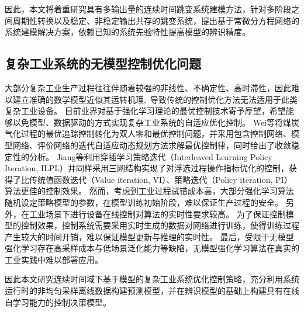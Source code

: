 因此，本文将着重研究具有多输出量的连续时间跳变系统建模方法，针对多阶段之间周期性转换以及稳定、非稳定输出共存的跳变系统，提出基于常微分方程网络的系统建模解决方案，依赖已知的系统先验特性提高模型的辨识精度。

\subsection{复杂工业系统的无模型控制优化问题}
大部分复杂工业生产过程往往伴随着较强的非线性、不确定性、高时滞性，因此难以建立准确的数学模型近似其运转机理, 导致传统的控制优化方法无法适用于此类复杂工业设备。
目前业界对基于强化学习理论的最优控制技术\cite{Sutton2018,F.L.LewisD.Vrabie2012}寄予厚望，希望能够以免模型、数据驱动的方式实现复杂工业系统的自适应优化控制。
Wei等\cite{Wei2014}将煤炭气化过程的最优追踪控制转化为双人零和最优控制问题，并采用包含控制网络、模型网络、评价网络的迭代自适应动态规划方法求解最优控制律，同时给出了收敛稳定性的分析。
Jiang等\cite{Jiang2018}利用穿插学习策略迭代（Interleaved Learning
Policy Iteration, ILPL）并同样采用三网结构实现了对浮选过程操作指标优化的控制，获得了比传统值函数迭代（Value iteration, VI）、策略迭代（Policy iteration, PI）算法更佳的控制效果。
然而，考虑到工业过程试错成本高，大部分强化学习算法随机设定策略模型的参数，在模型训练初始阶段，难以保证生产过程的安全。
另外，在工业场景下进行设备在线控制对算法的实时性要求较高。
为了保证控制模型的控制效果，控制系统需要采用实时生成的数据对网络进行训练，使得训练过程产生较大的时间开销，难以保证模型更新与推理的实时性。
最后，受限于无模型强化学习存在高采样成本与低场景泛化能力等缺陷，无模型强化学习算法在真实的工业实践中难以部署应用。

因此本文研究连续时间域下基于模型的复杂工业系统优化控制策略，充分利用系统运行时的非均匀采样离线数据构建预测模型，并在辨识模型的基础上构建具有在线自学习能力的控制决策模型。

